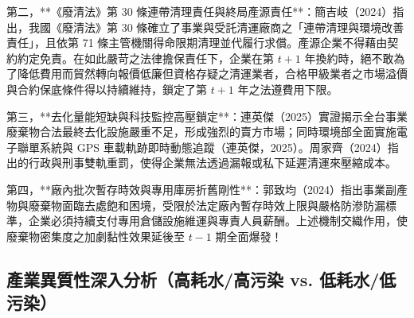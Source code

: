 \documentclass[12pt,a4paper]{article}
\begin{document}
第二，**《廢清法》第 30 條連帶清理責任與終局產源責任**：簡吉岐（2024）指出，我國《廢清法》第 30 條確立了事業與受託清運廠商之「連帶清理與環境改善責任」，且依第 71 條主管機關得命限期清理並代履行求償。產源企業不得藉由契約約定免責。在如此嚴苛之法律擔保責任下，企業在第 $t+1$ 年換約時，絕不敢為了降低費用而貿然轉向報價低廉但資格存疑之清運業者，合格甲級業者之市場溢價與合約保底條件得以持續維持，鎖定了第 $t+1$ 年之法遵費用下限。

第三，**去化量能短缺與科技監控高壓鎖定**：連英傑（2025）實證揭示全台事業廢棄物合法最終去化設施嚴重不足，形成強烈的賣方市場；同時環境部全面實施電子聯單系統與 GPS 車載軌跡即時動態追蹤（連英傑，2025）。周家齊（2024）指出的行政與刑事雙軌重罰，使得企業無法透過漏報或私下延遲清運來壓縮成本。

第四，**廠內批次暫存時效與專用庫房折舊剛性**：郭致均（2024）指出事業副產物與廢棄物面臨去處飽和困境，受限於法定廠內暫存時效上限與嚴格防滲防漏標準，企業必須持續支付專用倉儲設施維運與專責人員薪酬。上述機制交織作用，使廢棄物密集度之加劇黏性效果延後至 $t-1$ 期全面爆發！

\subsection{產業異質性深入分析（高耗水/高污染 vs. 低耗水/低污染）}
\end{document}
